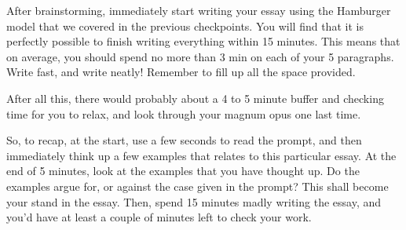 \documentclass[DIV=calc,11pt,parskip,numbers=noenddot]{scrartcl} %
\begin{document}
After brainstorming, immediately start writing your essay using the Hamburger model that we covered in the previous checkpoints. You will find that it is perfectly possible to finish writing everything within 15 minutes. This means that on average, you should spend no more than 3 min on each of your 5 paragraphs. Write fast, and write neatly! Remember to fill up all the space provided.

After all this, there would probably about a 4 to 5 minute buffer and checking time for you to relax, and look through your magnum opus one last time.

So, to recap, at the start, use a few seconds to read the prompt, and then immediately think up a few examples that relates to this particular essay. At the end of 5 minutes, look at the examples that you have thought up. Do the examples argue for, or against the case given in the prompt? This shall become your stand in the essay. Then, spend 15 minutes madly writing the essay, and you’d have at least a couple of minutes left to check your work.
\end{document}
